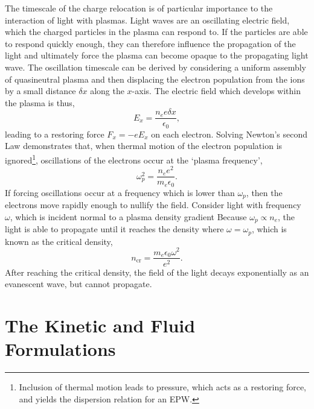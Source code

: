The timescale of the charge relocation is of particular importance to the interaction of light with plasmas.
Light waves are an oscillating electric field, which the charged particles in the plasma can respond to.
If the particles are able to respond quickly enough, they can therefore influence the propagation of the light and ultimately force the plasma can become opaque to the propagating light wave.
The oscillation timescale can be derived by considering a uniform assembly of quasineutral plasma and then displacing the electron population from the ions by a small distance $\delta x$ along the $x$-axis.
The electric field which develops within the plasma is thus,
\begin{equation}
    E_x = \frac{n_e e \delta x}{\epsilon_0},
\end{equation}
leading to a restoring force $F_x = -eE_x$ on each electron.
Solving Newton's second Law demonstrates that, when thermal motion of the electron population is ignored\footnote{Inclusion of thermal motion leads to pressure, which acts as a restoring force, and yields the dispersion relation for an \ac{EPW}.}, oscillations of the electrons occur at the `plasma frequency',
\begin{equation}
    \label{eq:theory_plasma_freq}
    \omega_{p}^2 = \frac{n_e e^2}{m_e \epsilon_0}.
\end{equation}
If forcing oscillations occur at a frequency which is lower than $\omega_p$, then the electrons move rapidly enough to nullify the field.
Consider light with frequency $\omega$, which is incident normal to a plasma density gradient
Because $\omega_p\propto n_e$, the light is able to propagate until it reaches the density where $\omega = \omega_p$, which is known as the critical density,
\begin{equation}
    \label{eq:theory_critical_density}
    n_{\text{cr}} = \frac{m_e \epsilon_0 \omega^2}{e^2}.
\end{equation}
After reaching the critical density, the field of the light decays exponentially as an evanescent wave, but cannot propagate.

\section{The Kinetic and Fluid Formulations}%
\label{sec:theory_kin_fluid_plasmas}

